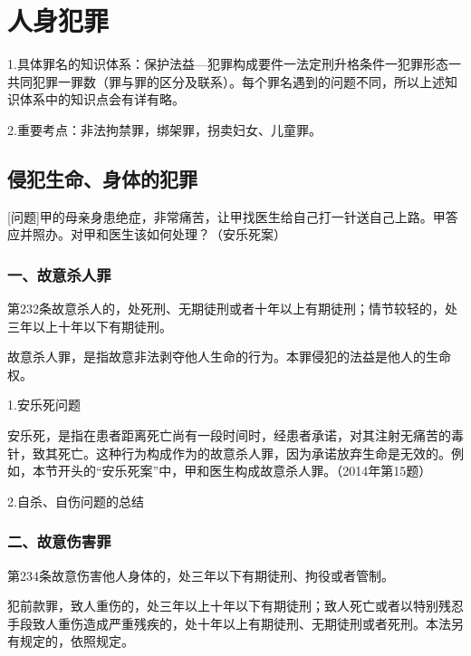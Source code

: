 \chapter{人身犯罪}

\begin{EditionOpeningPanel}
1.具体罪名的知识体系：保护法益—犯罪构成要件一法定刑升格条件一犯罪形态一共同犯罪一罪数（罪与罪的区分及联系）。每个罪名遇到的问题不同，所以上述知识体系中的知识点会有详有略。

2.重要考点：非法拘禁罪，绑架罪，拐卖妇女、儿童罪。
\end{EditionOpeningPanel}

\section{侵犯生命、身体的犯罪}

[问题]甲的母亲身患绝症，非常痛苦，让甲找医生给自己打一针送自己上路。甲答应并照办。对甲和医生该如何处理？（安乐死案）

\subsection*{一、故意杀人罪}

第232条故意杀人的，处死刑、无期徒刑或者十年以上有期徒刑；情节较轻的，处三年以上十年以下有期徒刑。

故意杀人罪，是指故意非法剥夺他人生命的行为。本罪侵犯的法益是他人的生命权。

1.安乐死问题

安乐死，是指在患者距离死亡尚有一段时间时，经患者承诺，对其注射无痛苦的毒针，致其死亡。这种行为构成作为的故意杀人罪，因为承诺放弃生命是无效的。例如，本节开头的“安乐死案”中，甲和医生构成故意杀人罪。（2014年第15题）

2.自杀、自伤问题的总结



\subsection*{二、故意伤害罪}

第234条故意伤害他人身体的，处三年以下有期徒刑、拘役或者管制。

犯前款罪，致人重伤的，处三年以上十年以下有期徒刑；致人死亡或者以特别残忍手段致人重伤造成严重残疾的，处十年以上有期徒刑、无期徒刑或者死刑。本法另有规定的，依照规定。

